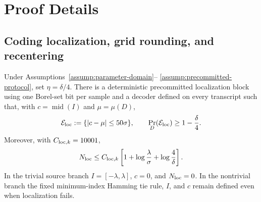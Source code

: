 \appendix

\section{Proof Details}

\subsection{Coding localization, grid rounding, and recentering}

\begin{proposition}
\label{prop:localization}
Under Assumptions~\ref{assump:parameter-domain}--
\ref{assump:precommitted-protocol}, set $\eta=\delta/4$.  There is a
deterministic precommitted localization block using one Borel-set bit per
sample and a decoder defined on every transcript such that, with
$c=\operatorname{mid}(I)$ and $\mu=\mu(D)$,
\[
 \mathcal E_{\rm loc}:=\{|c-\mu|\leq50\sigma\},
 \qquad \Pr_D(\mathcal E_{\rm loc})\geq1-\frac\delta4.
\]
Moreover, with $C_{{\rm loc},k}=10001$,
\[
 N_{\rm loc}\leq C_{{\rm loc},k}
 \left[1+\log\frac\lambda\sigma+\log\frac4\delta\right].
\]
In the trivial source branch $I=[-\lambda,\lambda]$, $c=0$, and
$N_{\rm loc}=0$.  In the nontrivial branch the fixed minimum-index Hamming
tie rule, $I$, and $c$ remain defined even when localization fails.
\end{proposition}

